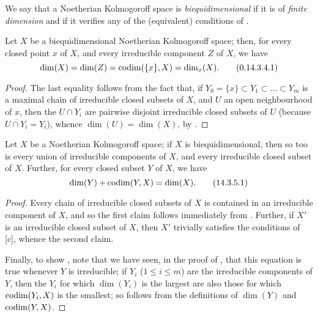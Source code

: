We say that a Noetherian Kolmogoroff space is \emph{biequidimensional} if it is of \emph{finite dimension} and if it verifies any of the (equivalent) conditions of .

\begin{cor}[14.3.4]
\label{0.14.3.4}
Let $X$ be a biequidimensional Noetherian Kolmogoroff space;
then, for every closed point $x$ of $X$, and every irreducible component $Z$ of $X$, we have
\begin{equation*}
\label{0.14.3.4.1}
    {\mathop{\mathrm{dim}}\nolimits}(X) = {\mathop{\mathrm{dim}}\nolimits}(Z) = {\mathop{\mathrm{codim}}\nolimits}(\{x\},X) = {\mathop{\mathrm{dim}}\nolimits}_x(X).\tag{0.14.3.4.1}
\end{equation*}
\end{cor}

\begin{proof}
\label{proof-0.14.3.4}
The last equality follows from the fact that, if $Y_0=\{x\}\subset Y_1\subset\ldots\subset Y_m$ is a maximal chain of irreducible closed subsets of $X$, and $U$ an open neighbourhood of $x$, then the $U\cap Y_i$ are pairwise disjoint irreducible closed subsets of $U$ (because $\overline{U\cap Y_i}=Y_i$), whence $\dim(U)=\dim(X)$, by .
\end{proof}

\begin{cor}[14.3.5]
\label{0.14.3.5}
Let $X$ be a Noetherian Kolmogoroff space;
if $X$ is biequidimensional, then so too is every union of irreducible components of $X$, and every irreducible closed subset of $X$.
Further, for every closed subset $Y$ of $X$, we have
\begin{equation*}
\label{0.14.3.5.1}
    {\mathop{\mathrm{dim}}\nolimits}(Y)+{\mathop{\mathrm{codim}}\nolimits}(Y,X) = {\mathop{\mathrm{dim}}\nolimits}(X).\tag{14.3.5.1}
\end{equation*}
\end{cor}

\begin{proof}
\label{proof-0.14.3.5}
Every chain of irreducible closed subsets of $X$ is contained in an irreducible component of $X$, and so the first claim follows immediately from .
Further, if $X'$ is an irreducible closed subset of $X$, then $X'$ trivially satisfies the conditions of [c], whence the second claim.

Finally, to show , note that we have seen, in the proof of , that this equation is true whenever $Y$ is irreducible;
if $Y_i$ ($1\leq i\leq m$) are the irreducible components of $Y$, then the $Y_i$ for which $\dim(Y_i)$ is the largest are also those for which ${\mathop{\mathrm{codim}}\nolimits}(Y_i,X)$ is the smallest;
so  follows from the definitions of $\dim(Y)$ and ${\mathop{\mathrm{codim}}\nolimits}(Y,X)$.
\end{proof}

